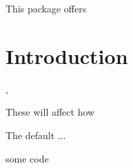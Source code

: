 \documentclass[10pt]{article}
\begin{document}
  

\begin{typesetabstract}
 
This package offers 
\end{typesetabstract}


\section{Introduction}

\begin{codedescribe}{\somecmd,\somecmd}
\begin{codesyntax}%
\tsmacro{\somecmd}{}
\tsmacro{\somecmd}{}
\end{codesyntax}
These will affect how
\end{codedescribe}
\begin{tsremark}
  The default ...
\end{tsremark}


\begin{codestore}[demoA]
some code
\end{codestore}




\end{document}
